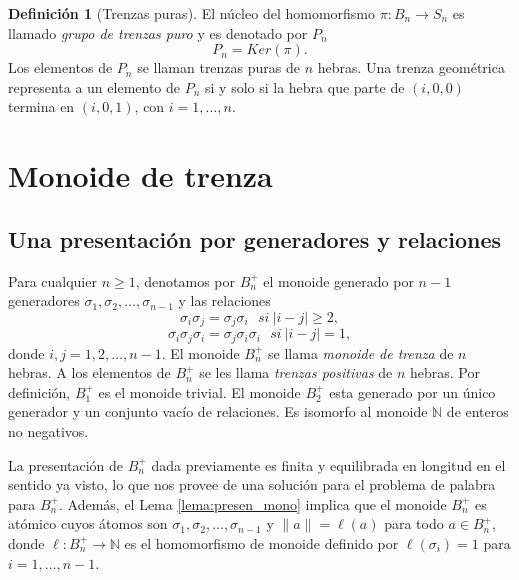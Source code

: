\documentclass[12pt]{book}
\theoremstyle{definition}
\newtheorem{defi}{Definición}[section]
\providecommand{\norm}[1]{\lVert#1\rVert}
\begin{document}
\begin{defi}[Trenzas puras]
El núcleo del homomorfismo $\pi:B_n\rightarrow S_n$ es llamado \textit{grupo de trenzas puro} y es denotado por $P_n$
$$P_n = Ker(\pi).$$
Los elementos de $P_n$ se llaman trenzas puras de $n$ hebras. Una trenza geométrica representa a un elemento de $P_n$ si y solo si la hebra que parte de $(i,0,0)$ termina en $(i,0,1)$, con $i = 1,\ldots,n$.

\end{defi}



















\chapter{Monoide de trenza}

\section{Una presentación por generadores y relaciones}

Para cualquier $n\geq 1$, denotamos por $B_n^+$ el monoide generado por $n-1$ generadores $\sigma_1,\sigma_2,\ldots,\sigma_{n-1}$ y las relaciones
$$\sigma_i\sigma_j=\sigma_j\sigma_i\ \ \ si\ |i-j|\geq 2,$$
$$\sigma_i\sigma_j\sigma_i=\sigma_j\sigma_i\sigma_i\ \ \ si\ |i-j|= 1,$$
donde $i,j=1,2,\ldots,n-1$. El monoide $B_n^+$ se llama \textit{monoide de trenza} de $n$ hebras. A los elementos de $B_n^+$ se les llama \textit{trenzas positivas} de $n$ hebras. Por definición, $B_1^+$ es el monoide trivial. El monoide $B_2^+$ esta generado por un único generador y un conjunto vacío de relaciones. Es isomorfo al monoide $\mathbb{N}$ de enteros no negativos.

La presentación de $B_n^+$ dada previamente es finita y equilibrada en longitud en el sentido ya visto, lo que nos provee de una solución para el problema de palabra para $B_n^+$. Además, el Lema \ref{lema:presen_mono} implica que el monoide $B_n^+$ es atómico cuyos átomos son $\sigma_1,\sigma_2,\ldots,\sigma_{n-1}$ y $\norm{a}=\ell(a)$ para todo $a\in B_n^+$, donde $\ell : B_n^+\rightarrow \mathbb{N}$ es el homomorfismo de monoide definido por $\ell(\sigma_i)=1$ para $i=1,\ldots,n-1$.
\end{document}
